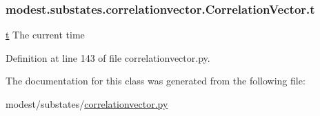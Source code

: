 \subsubsection[{\texorpdfstring{t}{t}}]{\setlength{\rightskip}{0pt plus 5cm}modest.\+substates.\+correlationvector.\+Correlation\+Vector.\+t}\hypertarget{classmodest_1_1substates_1_1correlationvector_1_1CorrelationVector_a127ca6c8eed6a2e822dbac7e83458bf3}{}\label{classmodest_1_1substates_1_1correlationvector_1_1CorrelationVector_a127ca6c8eed6a2e822dbac7e83458bf3}


\hyperlink{classmodest_1_1substates_1_1correlationvector_1_1CorrelationVector_a127ca6c8eed6a2e822dbac7e83458bf3}{t} The current time 



Definition at line 143 of file correlationvector.\+py.



The documentation for this class was generated from the following file\+:\begin{DoxyCompactItemize}
\item 
modest/substates/\hyperlink{correlationvector_8py}{correlationvector.\+py}\end{DoxyCompactItemize}
